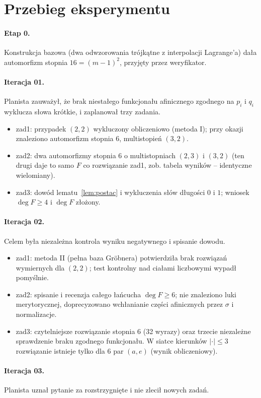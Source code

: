 \section{Przebieg eksperymentu}

\paragraph{Etap 0.} Konstrukcja bazowa (dwa odwzorowania trójkątne z interpolacji Lagrange'a)
dała automorfizm stopnia $16=(m-1)^2$, przyjęty przez weryfikator.

\paragraph{Iteracja 01.} Planista zauważył, że brak niestałego funkcjonału afinicznego zgodnego
na $p_i$ i $q_i$ wyklucza słowa krótkie, i zaplanował trzy zadania.
\begin{itemize}
\item zad1: przypadek $(2,2)$ wykluczony obliczeniowo (metoda I); przy okazji znaleziono
automorfizm stopnia 6, multistopień $(3,2)$.
\item zad2: dwa automorfizmy stopnia 6 o multistopniach $(2,3)$ i $(3,2)$ (ten drugi daje
to samo $F$ co rozwiązanie zad1, zob. tabela wyników -- identyczne wielomiany).
\item zad3: dowód lematu~\ref{lem:postac} i wykluczenia słów długości $0$ i $1$; wniosek
$\deg F\ge4$ i $\deg F$ złożony.
\end{itemize}

\paragraph{Iteracja 02.} Celem była niezależna kontrola wyniku negatywnego i spisanie dowodu.
\begin{itemize}
\item zad1: metoda II (pełna baza Gröbnera) potwierdziła brak rozwiązań wymiernych dla $(2,2)$;
test kontrolny nad ciałami liczbowymi wypadł pomyślnie.
\item zad2: spisanie i recenzja całego łańcucha $\deg F\ge6$; nie znaleziono luki merytorycznej,
doprecyzowano wchłanianie części afinicznych przez $\sigma$ i normalizacje.
\item zad3: czytelniejsze rozwiązanie stopnia 6 (32 wyrazy) oraz trzecie niezależne sprawdzenie
braku zgodnego funkcjonału. W siatce kierunków $|\cdot|\le3$ rozwiązanie istnieje tylko dla 6 par
$(a,e)$ (wynik obliczeniowy).
\end{itemize}

\paragraph{Iteracja 03.} Planista uznał pytanie za rozstrzygnięte i nie zlecił nowych zadań.
